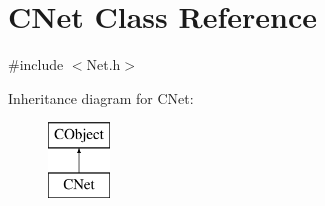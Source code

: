 \hypertarget{classCNet}{}\section{C\+Net Class Reference}
\label{classCNet}


{\ttfamily \#include $<$Net.\+h$>$}

Inheritance diagram for C\+Net\+:\begin{figure}[H]
\begin{center}
\leavevmode
\includegraphics[height=2.000000cm]{classCNet}
\end{center}
\end{figure}
